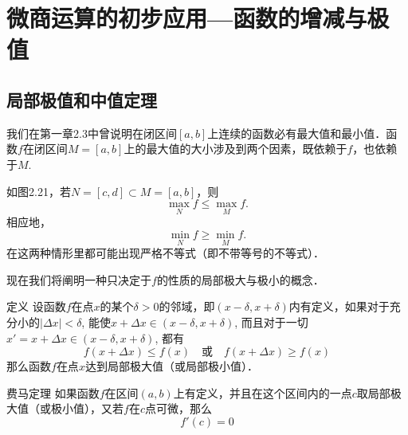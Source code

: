 \section{微商运算的初步应用{}---{}函数的增减与极值}

\subsection{局部极值和中值定理}
我们在第一章2.3中曾说明在闭区间$[a,b]$上连续的函数必有最大值和最小值．函数$f$在闭区间$M=[a,b]$上的最大值的大小涉及到两个因素，既依赖于$f$，也依赖于$M$.

如图2.21，若$N=[c,d]\subset M=[a,b]$，则
\[
\max_N f \le \max_M f.
\]
相应地，
\[
\min_N f \ge \min_M f.
\]
在这两种情形里都可能出现严格不等式（即不带等号的不等式）．

\begin{figure}[htp]
    \centering
    \caption{}
\end{figure}

现在我们将阐明一种只决定于$f$的性质的局部极大与极小的概念．

\begin{blk}
    {定义} 设函数$f$在点$x$的某个$\delta>0$的邻域，即$(x-\delta,x+\delta)$内有定义，如果对于充分小的$|\Delta x|<\delta$, 能使$x+\Delta x\in (x-\delta,x+\delta)$, 而且对于一切$x'=x+\Delta x\in (x-\delta,x+\delta)$, 都有
\[f(x+\Delta x)\le f(x)\quad \text{或}\quad f(x+\Delta x)\ge f(x)\]
那么函数$f$在点$x$达到局部极大值（或局部极小值）．
\end{blk}

\begin{blk}
    {费马定理} 如果函数$f$在区间$(a,b)$上有定义，并且在这个区间内的一点$c$取局部极大值（或极小值），又若$f$在$c$点可微，那么
    \[f' (c) =0\]
\end{blk}

